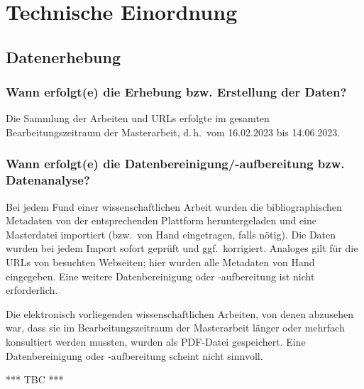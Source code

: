 \section{Technische Einordnung}

\subsection{Datenerhebung}

\subsubsection{Wann erfolgt(e) die Erhebung bzw. Erstellung der Daten?}

Die Sammlung der Arbeiten und URLs erfolgte im gesamten Bearbeitungszeitraum der Masterarbeit, d.\,h.\ vom 16.02.2023 bis 14.06.2023.

\subsubsection{Wann erfolgt(e) die Datenbereinigung/-aufbereitung bzw. Datenanalyse?}

Bei jedem Fund einer wissenschaftlichen Arbeit wurden die bibliographischen Metadaten von der entsprechenden Plattform heruntergeladen
und eine Masterdatei importiert (bzw.\ von Hand eingetragen, falls nötig). Die Daten wurden bei jedem Import sofort geprüft und ggf.\
korrigiert. Analoges gilt für die URLs von besuchten Webseiten; hier wurden alle Metadaten von Hand eingegeben.
Eine weitere Datenbereinigung oder -aufbereitung ist nicht erforderlich.

Die elektronisch vorliegenden wissenschaftlichen Arbeiten, von denen abzusehen war, dass sie im Bearbeitungszeitraum der Masterarbeit
länger oder mehrfach konsultiert werden mussten, wurden als PDF-Datei gespeichert.
Eine Datenbereinigung oder -aufbereitung scheint nicht sinnvoll.



*** TBC ***


